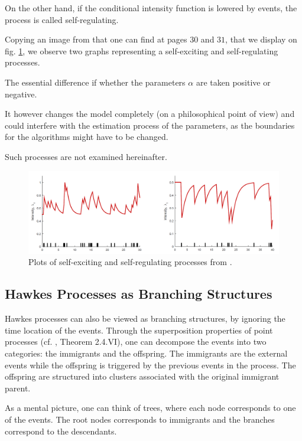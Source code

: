 On the other hand, if the conditional intensity function is lowered by events, the process is called self-regulating. 

Copying an image from \cite{obral} that one can find at pages $30$ and $31$, that we display on fig. \ref{fig:obral}, we observe two graphs representing a self-exciting and self-regulating processes. 

The essential difference if whether the parameters $\alpha$ are taken positive or negative. 

It however changes the model completely (on a philosophical point of view) and could interfere with the estimation process of the parameters, as the boundaries for the algorithms might have to be changed.

Such processes are not examined hereinafter.

\begin{figure}
\centering
\includegraphics[width = 0.90 \textwidth]{../imag/chap1/obral.png}
\caption{ Plots of self-exciting and self-regulating processes from \cite{obral}.}
\label{fig:obral}
\end{figure}












\subsection{Hawkes Processes as Branching Structures}
Hawkes processes can also be viewed as branching structures, by ignoring the time location of the events. Through the superposition
properties of point processes (cf. \cite{daley}, Theorem 2.4.VI), one can decompose the events into two categories: the immigrants and the offspring. The immigrants are the external events while the offspring is triggered by the previous events in the process. The offspring are structured into clusters associated with the original immigrant parent. 

As a mental picture, one can think of trees, where each node corresponds to one of the events. The root nodes corresponds to immigrants and the branches correspond to the descendants.

